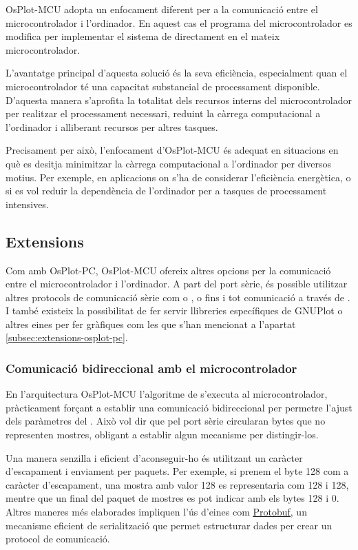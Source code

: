 \documentclass{tfgitic}[2023/07/07]
\begin{document}
OsPlot-MCU adopta un enfocament diferent per a la comunicació entre el
microcontrolador i l'ordinador. En aquest cas el programa del
microcontrolador es modifica per implementar el sistema de
 directament en el mateix microcontrolador.

L'avantatge principal d'aquesta solució és la seva eficiència,
especialment quan el microcontrolador té una capacitat substancial de
processament disponible. D'aquesta manera s'aprofita la totalitat dels
recursos interns del microcontrolador per realitzar el processament
necessari, reduint la càrrega computacional a l'ordinador i alliberant
recursos per altres tasques.

Precisament per això, l'enfocament d'OsPlot-MCU és adequat en
situacions en què es desitja minimitzar la càrrega computacional a
l'ordinador per diversos motius. Per exemple, en aplicacions on s'ha
de considerar l'eficiència energètica, o si es vol reduir la
dependència de l'ordinador per a tasques de processament intensives.

\subsection{Extensions}

Com amb OsPlot-PC, OsPlot-MCU ofereix altres opcions per la
comunicació entre el microcontrolador i l'ordinador. A part del port
sèrie, és possible utilitzar altres protocols de comunicació sèrie com
 o , o fins i tot comunicació a través de
. I també existeix la possibilitat de fer servir
llibreries específiques de GNUPlot o altres eines per fer gràfiques
com les que s'han mencionat a l'apartat
\ref{subsec:extensions-osplot-pc}.

\subsubsection{Comunicació bidireccional amb el microcontrolador}

En l'arquitectura OsPlot-MCU l'algoritme de  s'executa al
microcontrolador, pràcticament forçant a establir una comunicació
bidireccional per permetre l'ajust dels paràmetres del .
Això vol dir que pel port sèrie circularan bytes que no representen
mostres, obligant a establir algun mecanisme per distingir-los.

Una manera senzilla i eficient d'aconseguir-ho és utilitzant un
caràcter d'escapament i enviament per paquets. Per exemple, si prenem
el byte \num{128} com a caràcter d'escapament, una mostra amb valor
\num{128} es representaria com \num{128} i \num{128}, mentre que un
final del paquet de mostres es pot indicar amb els bytes \num{128} i
\num{0}. Altres maneres més elaborades impliquen l'ús d'eines com
\href{https://protobuf.dev/}{\underline{Protobuf}}, un mecanisme
eficient de serialització que permet estructurar dades per crear un
protocol de comunicació.
\end{document}
